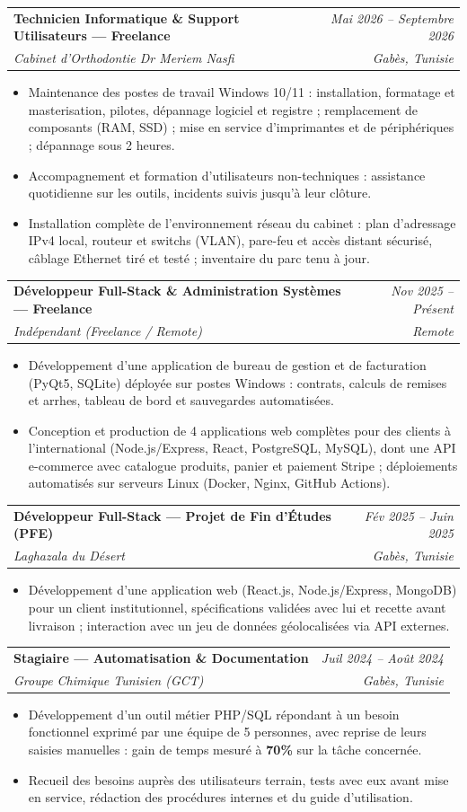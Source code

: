 \documentclass[letterpaper,9pt]{article}
\makeatletter
\newcommand{\resumeItem}[1]{\item\small{#1}}
\newcommand{\resumeSubheading}[4]{
  \vspace{-1pt}\item
  \begin{tabular*}{0.97\textwidth}[t]{l@{\extracolsep{\fill}}r}
    \textbf{#1} & \textit{\color{greytext}#2} \\
    \textit{\small\color{greytext} #3} & \textit{\small\color{greytext} #4}
  \end{tabular*}\vspace{-2pt}
}
\newcommand{\resumeItemListStart}{\begin{itemize}[leftmargin=0.24in, label={}, itemsep=0.9pt, topsep=1.2pt, parsep=0pt]}
\newcommand{\resumeItemListEnd}{\end{itemize}\vspace{-2pt}}
\makeatother
\begin{document}
  \resumeSubheading{Technicien Informatique \& Support Utilisateurs --- Freelance}{Mai 2026 -- Septembre 2026}{Cabinet d'Orthodontie Dr Meriem Nasfi}{Gabès, Tunisie}
    \resumeItemListStart
      \resumeItem{Maintenance des postes de travail Windows 10/11 : installation, formatage et masterisation, pilotes, dépannage logiciel et registre ; remplacement de composants (RAM, SSD) ; mise en service d'imprimantes et de périphériques ; dépannage sous 2 heures.}
      \resumeItem{Accompagnement et formation d'utilisateurs non-techniques : assistance quotidienne sur les outils, incidents suivis jusqu'à leur clôture.}
      \resumeItem{Installation complète de l'environnement réseau du cabinet : plan d'adressage IPv4 local, routeur et switchs (VLAN), pare-feu et accès distant sécurisé, câblage Ethernet tiré et testé ; inventaire du parc tenu à jour.}
    \resumeItemListEnd

  \resumeSubheading{Développeur Full-Stack \& Administration Systèmes --- Freelance}{Nov 2025 -- Présent}{Indépendant (Freelance / Remote)}{Remote}
    \resumeItemListStart
      \resumeItem{Développement d'une application de bureau de gestion et de facturation (PyQt5, SQLite) déployée sur postes Windows : contrats, calculs de remises et arrhes, tableau de bord et sauvegardes automatisées.}
      \resumeItem{Conception et production de 4 applications web complètes pour des clients à l'international (Node.js/Express, React, PostgreSQL, MySQL), dont une API e-commerce avec catalogue produits, panier et paiement Stripe ; déploiements automatisés sur serveurs Linux (Docker, Nginx, GitHub Actions).}
    \resumeItemListEnd

  \resumeSubheading{Développeur Full-Stack --- Projet de Fin d'Études (PFE)}{Fév 2025 -- Juin 2025}{Laghazala du Désert}{Gabès, Tunisie}
    \resumeItemListStart
      \resumeItem{Développement d'une application web (React.js, Node.js/Express, MongoDB) pour un client institutionnel, spécifications validées avec lui et recette avant livraison ; interaction avec un jeu de données géolocalisées via API externes.}
    \resumeItemListEnd

  \resumeSubheading{Stagiaire --- Automatisation \& Documentation}{Juil 2024 -- Août 2024}{Groupe Chimique Tunisien (GCT)}{Gabès, Tunisie}
    \resumeItemListStart
      \resumeItem{Développement d'un outil métier PHP/SQL répondant à un besoin fonctionnel exprimé par une équipe de 5 personnes, avec reprise de leurs saisies manuelles : gain de temps mesuré à \textbf{70\%} sur la tâche concernée.}
      \resumeItem{Recueil des besoins auprès des utilisateurs terrain, tests avec eux avant mise en service, rédaction des procédures internes et du guide d'utilisation.}
    \resumeItemListEnd
\end{document}
